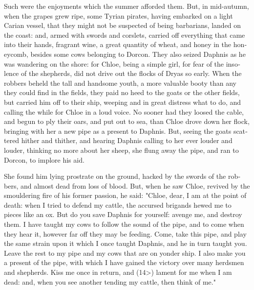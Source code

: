 \documentclass{book}
\begin{document}
\begin{pairs}
\begin{Rightside}
\begin{english}
  Such were the enjoyments which the summer afforded them.  But, in mid-autumn, when the grapes grew ripe, some Tyrian pirates, having embarked on a light Carian vessel, that they might not be suspected of being barbarians, landed on the coast: and, armed with swords and corslets, carried off everything that came into their hands, fragrant wine, a great quantity of wheat, and honey in the honeycomb, besides some cows belonging to Dorcon.  They also seized Daphnis as he was wandering on the shore: for Chloe, being a simple girl, for fear of the insolence of the shepherds, did not drive out the flocks of Dryas so early.  When the robbers beheld the tall and handsome youth, a more valuable booty than any they could find in the fields, they paid no heed to the goats or the other fields, but carried him off to their ship, weeping and in great distress what to do, and calling the while for Chloe in a loud voice.  No sooner had they loosed the cable, and begun to ply their oars, and put out to sea, than Chloe drove down her flock, bringing with her a new pipe as a present to Daphnis.  But, seeing the goats scattered hither and thither, and hearing Daphnis calling to her ever louder and louder, thinking no more about her sheep, she flung away the pipe, and ran to Dorcon, to implore his aid.
\pend


  She found him lying prostrate on the ground, hacked by the swords of the robbers, and almost dead from loss of blood.  But, when he saw Chloe, revived by the smouldering fire of his former passion, he said: "Chloe, dear, I am at the point of death: when I tried to defend my cattle, the accursed brigands hewed me to pieces like an ox.  But do you save Daphnis for yourself: avenge me, and destroy them.  I have taught my cows to follow the sound of the pipe, and to come when they hear it, however far off they may be feeding.  Come, take this pipe, and play the same strain upon it which I once taught Daphnis, and he in turn taught you.  Leave the rest to my pipe and my cows that are on yonder ship.  I also make you a present of the pipe, with which I have gained the victory over many herdsmen and shepherds.  Kiss me once in return, and (14>) lament for me when I am dead: and, when you see another tending my cattle, then think of me."
\pend



\end{english}
\end{Rightside}
\end{pairs}
\end{document}
